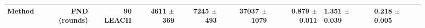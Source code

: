 \begin{tabular}{lrrrrrr}
\toprule
Method & FND (rounds) & 90 %
\midrule
LEACH & 4611 $\pm$ 369 & 7245 $\pm$ 493 & 37037 $\pm$ 1079 & 0.879 $\pm$ 0.011 & 1.351 $\pm$ 0.039 & 0.218 $\pm$ 0.005 \\
\bottomrule
\end{tabular}